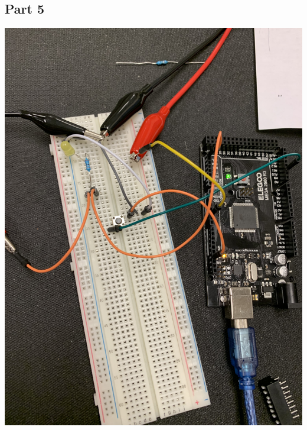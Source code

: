 \documentclass[]{article}
\begin{document}
\subsection*{Part 5}
\includegraphics[scale=.1]{images/5-0.jpg}\pagebreak
\end{document}
